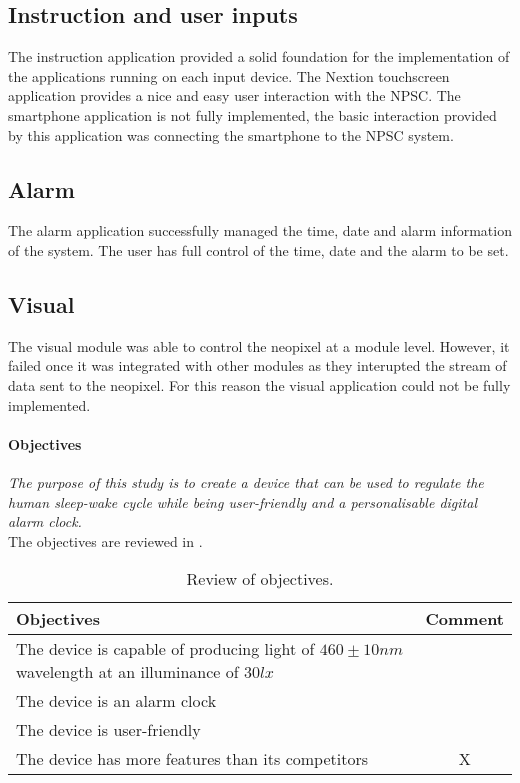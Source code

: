 \subsection{Instruction and user inputs}
The instruction application provided a solid foundation for the implementation of the applications running on each input device. The Nextion touchscreen application provides a nice and easy user interaction with the NPSC. The smartphone application is not fully implemented, the basic interaction provided by this application was connecting the smartphone to the NPSC system. 
\subsection{Alarm}
The alarm application successfully managed the time, date and alarm information of the system. The user has full control of the time, date and the alarm to be set.  
\subsection{Visual}
The visual module was able to control the neopixel at a module level. However, it failed once it was integrated with other modules as they interupted the stream of data sent to the neopixel. For this reason the visual application could not be fully implemented.

\paragraph{Objectives}
\textit{The purpose of this study is to create a device that can be used to regulate the human sleep-wake cycle while being user-friendly and a personalisable digital alarm clock.} \\
The objectives are reviewed in .
\begin{table}[h!]
	\centering
	\caption{Review of objectives.}
	\label{table:conclusion_objectives}
	\begin{tabular}{p{20em}c}
		\hline
		\hline
		\toprule
		\textbf{Objectives} & \textbf{Comment}\\
		\bottomrule
		\toprule
		The device is capable of producing light of $460\pm10nm$ wavelength at an illuminance of $30lx$ & \checkmark \\
		\midrule
		The device is an alarm clock & \checkmark \\
		\midrule
		The device is user-friendly & \checkmark \\
		\midrule
		The device has more features than its competitors & X \\
		\bottomrule
		\hline
		\hline
	\end{tabular}
\end{table}  

